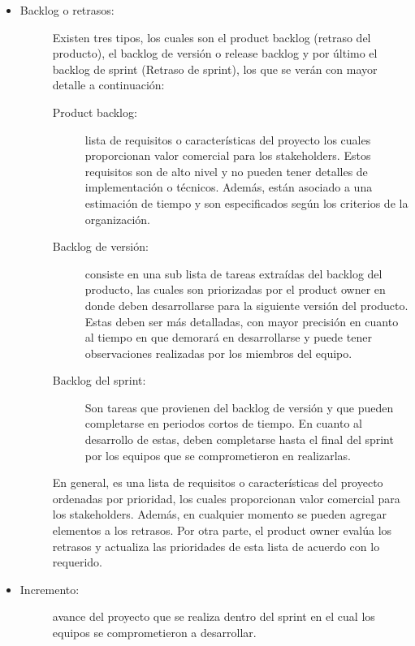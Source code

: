 \begin{itemize}
    \item   \begin{description}
                \item[Backlog o retrasos: ] Existen tres tipos, los cuales son el product backlog (retraso del producto), el backlog de versión o release backlog y por último el backlog de sprint (Retraso de sprint), los que se verán con mayor detalle a continuación:
                
                \begin{description}
                    \item[Product backlog: ] lista de requisitos o características del proyecto los cuales proporcionan valor comercial para los stakeholders. Estos requisitos son de alto nivel y no pueden tener detalles de implementación o técnicos. Además, están asociado a una estimación de tiempo y son especificados según los criterios de la organización.
                     
                    \item[Backlog de versión: ]  consiste en una sub lista de tareas extraídas del backlog del producto, las cuales son priorizadas por el product owner en donde deben desarrollarse para la siguiente versión del producto. Estas deben ser más detalladas, con mayor precisión en cuanto al tiempo en que demorará en desarrollarse y puede tener observaciones realizadas por los miembros del equipo.
                     
                    \item[Backlog del sprint: ] Son tareas que provienen del backlog de versión y que pueden completarse en periodos cortos de tiempo. En cuanto al desarrollo de estas, deben completarse hasta el final del sprint por los equipos que se comprometieron en realizarlas.
                \end{description}
                
                En general, es una lista de requisitos o características del proyecto ordenadas por prioridad, los cuales proporcionan valor comercial para los stakeholders. Además, en cualquier momento se pueden agregar elementos a los retrasos. Por otra parte, el product owner evalúa los retrasos y actualiza las prioridades de esta lista de acuerdo con lo requerido. 
            \end{description}    

    \item   \begin{description}
                \item[Incremento:] avance del proyecto que se realiza dentro del sprint en el cual los equipos se comprometieron a desarrollar.
            \end{description}
    

\end{itemize}
